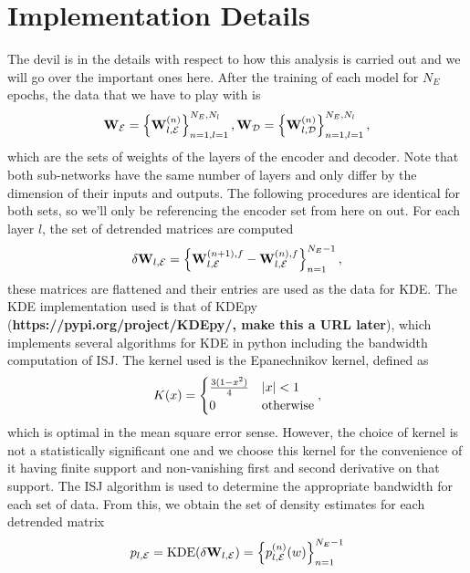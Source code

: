 \section{Implementation Details}
The devil is in the details with respect to how this analysis is carried out and we will
go over the important ones here. After the training of each model for $N_E$ epochs, the 
data that we have to play with is 
\begin{equation}
    {\bf W}_\mathcal{E} = \left\{{\bf W}_{l,\mathcal{E}}^{(n)}\right\}_{n=1, l=1}^{N_E, N_l}, 
    {\bf W}_\mathcal{D} = \left\{{\bf W}_{l,\mathcal{D}}^{(n)}\right\}_{n=1, l=1}^{N_E, N_l}, 
\end{equation}
which are the sets of weights of the layers of the encoder and decoder. Note that both sub-networks 
have the same number of layers and only differ by the dimension of their inputs and outputs.
The following procedures are identical for both sets, so we'll only be referencing the encoder set
from here on out. For each layer $l$, the set of detrended matrices are computed
\begin{equation}
    \delta{\bf W}_{l, \mathcal{E}} = \left\{{\bf W}_{l,\mathcal{E}}^{(n+1),f} - {\bf W}_{l,\mathcal{E}}^{(n),f}\right\}_{n=1}^{N_E-1},
\end{equation}
these matrices are flattened and their entries are used as the data for KDE. The KDE implementation
used is that of KDEpy ({\bf https://pypi.org/project/KDEpy/, make this a URL later}), which implements several 
algorithms for KDE in python including the bandwidth computation of ISJ. The kernel used is the Epanechnikov
kernel, defined as 
\begin{equation}
    K(x) = 
    \begin{cases}
        \frac{3(1-x^2)}{4} & \left|x\right| < 1 \\
        0 & \text{otherwise}
    \end{cases},\label{eqn:epanechnikov}
\end{equation}
which is optimal in the mean square error sense. However, the choice of kernel is not a statistically 
significant one\cite{epanechnikov} and we choose this kernel for the convenience of it having finite 
support and non-vanishing first and second derivative on that support. The ISJ algorithm is used to 
determine the appropriate bandwidth for each set of data. From this, we obtain the set of density 
estimates for each detrended matrix
\begin{equation}
    p_{l,\mathcal{E}} = \text{KDE}(\delta{\bf W}_{l, \mathcal{E}}) = \left\{p_{l,\mathcal{E}}^{(n)}(w)\right\}_{n=1}^{N_E-1}
\end{equation}
